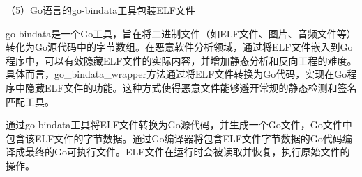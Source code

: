 （5）Go语言的go-bindata工具包装ELF文件


go-bindata是一个Go工具，旨在将二进制文件（如ELF文件、图片、音频文件等）转化为Go源代码中的字节数组。在恶意软件分析领域，通过将ELF文件嵌入到Go程序中，可以有效隐藏ELF文件的实际内容，并增加静态分析和反向工程的难度。具体而言，go\_bindata\_wrapper方法通过将ELF文件转换为Go代码，实现在Go程序中隐藏ELF文件的功能。这种方式使得恶意文件能够避开常规的静态检测和签名匹配工具。




通过go-bindata工具将ELF文件转换为Go源代码，并生成一个Go文件，Go文件中包含该ELF文件的字节数据。通过Go编译器将包含ELF文件字节数据的Go代码编译成最终的Go可执行文件。ELF文件在运行时会被读取并恢复，执行原始文件的操作。


